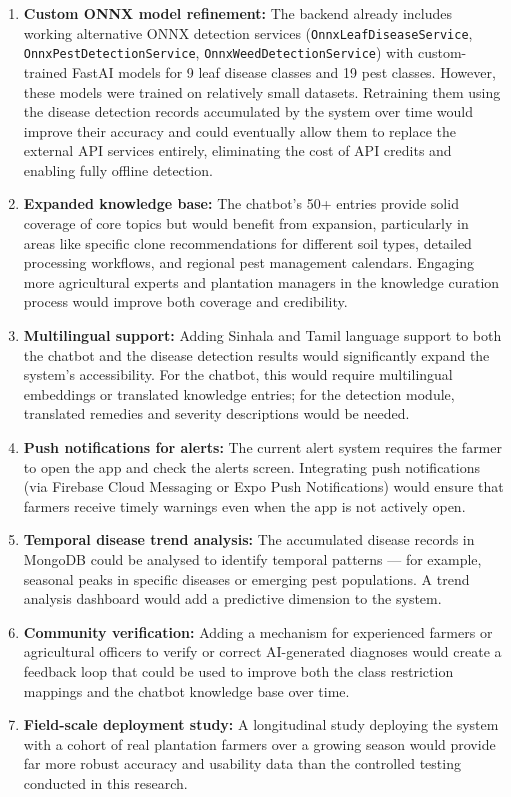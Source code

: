 \begin{enumerate}[label=\arabic*.]
    \item \textbf{Custom ONNX model refinement:} The backend already includes working alternative ONNX detection services (\texttt{OnnxLeafDiseaseService}, \texttt{OnnxPestDetectionService}, \texttt{OnnxWeedDetectionService}) with custom-trained FastAI models for 9 leaf disease classes and 19 pest classes. However, these models were trained on relatively small datasets. Retraining them using the disease detection records accumulated by the system over time would improve their accuracy and could eventually allow them to replace the external API services entirely, eliminating the cost of API credits and enabling fully offline detection.

    \item \textbf{Expanded knowledge base:} The chatbot's 50+ entries provide solid coverage of core topics but would benefit from expansion, particularly in areas like specific clone recommendations for different soil types, detailed processing workflows, and regional pest management calendars. Engaging more agricultural experts and plantation managers in the knowledge curation process would improve both coverage and credibility.

    \item \textbf{Multilingual support:} Adding Sinhala and Tamil language support to both the chatbot and the disease detection results would significantly expand the system's accessibility. For the chatbot, this would require multilingual embeddings or translated knowledge entries; for the detection module, translated remedies and severity descriptions would be needed.

    \item \textbf{Push notifications for alerts:} The current alert system requires the farmer to open the app and check the alerts screen. Integrating push notifications (via Firebase Cloud Messaging or Expo Push Notifications) would ensure that farmers receive timely warnings even when the app is not actively open.

    \item \textbf{Temporal disease trend analysis:} The accumulated disease records in MongoDB could be analysed to identify temporal patterns --- for example, seasonal peaks in specific diseases or emerging pest populations. A trend analysis dashboard would add a predictive dimension to the system.

    \item \textbf{Community verification:} Adding a mechanism for experienced farmers or agricultural officers to verify or correct AI-generated diagnoses would create a feedback loop that could be used to improve both the class restriction mappings and the chatbot knowledge base over time.

    \item \textbf{Field-scale deployment study:} A longitudinal study deploying the system with a cohort of real plantation farmers over a growing season would provide far more robust accuracy and usability data than the controlled testing conducted in this research.
\end{enumerate}

\newpage
